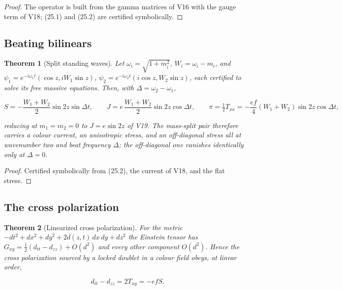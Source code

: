 \documentclass[11pt]{article}
\newtheorem{theorem}{Theorem}[section]
\theoremstyle{remark}
\begin{document}
\begin{proof}
The operator is built from the gamma matrices of V16 with the gauge
term of V18; (25.1) and (25.2) are certified symbolically.
\end{proof}

\subsection{Beating bilinears}

\begin{theorem}[Split standing waves]
\label{thm:v20v22-beat}
Let \(\omega_i=\sqrt{1+m_i^2}\), \(W_i=\omega_i-m_i\), and
\(\psi_1=e^{-i\omega_1t}(\cos z,iW_1\sin z)\),
\(\psi_2=e^{-i\omega_2t}(i\cos z,W_2\sin z)\), each certified to solve
its free massive equations.  Then, with \(\Delta=\omega_2-\omega_1\),

\[
 S=-\frac{W_1+W_2}2\sin2z\sin\Delta t,\qquad
 J=e\,\frac{W_1+W_2}2\sin2z\cos\Delta t,\qquad
 \pi=\tfrac12T_{xx}=-\frac{ef}4(W_1+W_2)\sin2z\cos\Delta t,
                                                                    \tag{25.3}
\]

reducing at \(m_1=m_2=0\) to \(J=e\sin2z\) of V19.  The mass-split pair
therefore carries a colour current, an anisotropic stress, and an
off-diagonal stress all at wavenumber two and beat frequency
\(\Delta\); the off-diagonal one vanishes identically only at
\(\Delta=0\).
\end{theorem}

\begin{proof}
Certified symbolically from (25.2), the current of V18, and the flat
stress.
\end{proof}

\subsection{The cross polarization}

\begin{theorem}[Linearized cross polarization]
\label{thm:v20v22-cross}
For the metric \(-dt^2+dx^2+dy^2+2d(z,t)\,dx\,dy+dz^2\) the Einstein
tensor has \(G_{xy}=\tfrac12(d_{tt}-d_{zz})+O(d^2)\) and every other
component \(O(d^2)\).  Hence the cross polarization sourced by a
locked doublet in a colour field obeys, at linear order,

\[
 d_{tt}-d_{zz}=2T_{xy}=-efS.                                          \tag{25.4}
\]
\end{theorem}
\end{document}
